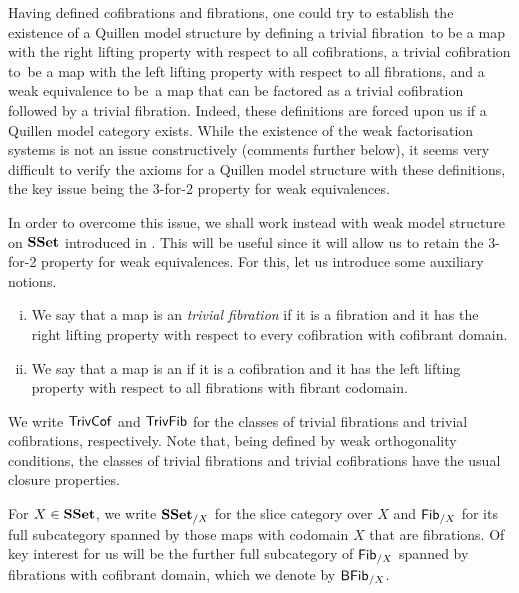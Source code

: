 \documentclass[reqno,10pt,a4paper,oneside,draft]{amsart}
\begin{document}
Having defined cofibrations and fibrations, one could try to establish the existence of a Quillen model structure by defining a trivial fibration~to be a map with the right lifting property with respect to all cofibrations, a trivial cofibration to~be a map with the left lifting property with respect to all fibrations, and a weak equivalence to be~a map that can be factored as a trivial cofibration followed by a trivial fibration. Indeed, 
these definitions are forced upon us if a Quillen model category exists. While the existence of the weak
factorisation systems is not an issue constructively (\cf comments further below), it seems  very difficult to verify the axioms for a Quillen model structure with these definitions, the key issue being  the  3-for-2 property for weak equivalences.  

\medskip

In order to overcome this issue, we shall work instead with weak model structure on $\mathbf{SSet}$ introduced  in \cite[Section~5]{henry2018wms}. This will be useful since it will allow us to retain the 3-for-2 property for weak equivalences. For this, let us introduce some auxiliary notions. 


\begin{definition} \label{def:trivfib-trivcof} \hfill
\begin{enumerate}[(i)]
\item We say that a map is an \emph{trivial fibration} if it is a fibration and it has the right lifting property
with respect to every cofibration with cofibrant domain.
\item We say that a map is an  if it is a cofibration and it has the left lifting property with respect to all fibrations with fibrant codomain.
\end{enumerate}
\end{definition}

We write $\mathsf{TrivCof}$ and $\mathsf{TrivFib}$ for the classes of trivial fibrations and trivial cofibrations, respectively.
Note that, being defined by weak orthogonality conditions, the classes of trivial fibrations
and trivial cofibrations have the usual closure properties. 

\bigskip



For $X \in \mathbf{SSet}$, we write $\mathbf{SSet}_{/X}$ for the slice category over $X$ and  $\mathsf{Fib}_{/X}$ for its full subcategory spanned by those maps with codomain $X$ that are fibrations. Of key interest for us will
be the further full subcategory of  $\mathsf{Fib}_{/X}$ spanned by fibrations with cofibrant domain, which we 
denote by  $\mathsf{BFib}_{/X}$.
\end{document}
